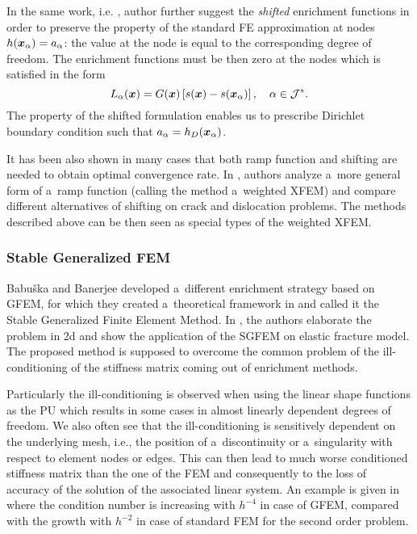 In the same work, i.e. \cite{fries_corrected_2008}, author further suggest the \emph{shifted} enrichment functions in order 
to preserve the property of the standard 
FE approximation at nodes $h(\mathbf{\boldsymbol{x}}_\alpha)=a_\alpha$: the value at the node is equal to the corresponding degree
of freedom. The enrichment functions must be then zero at the nodes which is satisfied in the form
\begin{equation} \label{eqn:xfem_shift}
    L_{\alpha}(\mathbf{\boldsymbol{x}}) = G(\mathbf{\boldsymbol{x}}) \left[s(\mathbf{\boldsymbol{x}}) - s(\mathbf{\boldsymbol{x}}_\alpha)\right],
    \quad \alpha\in\mathcal{J}^*.
\end{equation} 
The property of the shifted formulation enables us to prescribe Dirichlet boundary condition such that
$a_\alpha = h_D(\mathbf{\boldsymbol{x}}_\alpha)$.

It has been also shown in many cases that both ramp function and shifting are needed to obtain optimal convergence rate.
In \cite{ventura_fast_2009}, authors analyze a~more general form of a~ramp function (calling the method a~weighted XFEM)
and compare different alternatives of shifting on crack and dislocation problems. The methods described above can be then seen
as special types of the weighted XFEM. 


\subsubsection{Stable Generalized FEM} \label{sec:stable_gfem}


Babuška and Banerjee developed a~different enrichment strategy based on GFEM,
for which they created a~theoretical framework in \cite{babuska_stable_2012} and
called it the Stable Generalized Finite Element Method.
In \cite{gupta_stable_2013}, the authors elaborate the problem in 2d and show the application of the SGFEM on elastic fracture model.
The proposed method is supposed to overcome the common problem of the ill-conditioning of the stiffness matrix coming out of enrichment methods.

Particularly the ill-conditioning is observed when using the linear shape functions as the PU which results in some cases in almost linearly dependent degrees of freedom.
We also often see that the ill-conditioning is sensitively dependent on the underlying mesh, i.e., the position of a~discontinuity or a~singularity with respect to 
element nodes or edges.
This can then lead to much worse conditioned stiffness matrix than the one of the FEM
and consequently to the loss of accuracy of the solution of the associated linear system.
An example is given in \cite{babuska_stable_2012} where the condition number is increasing with $h^{-4}$ in case of GFEM,
compared with the growth with $h^{-2}$ in case of standard FEM for the second order problem.

